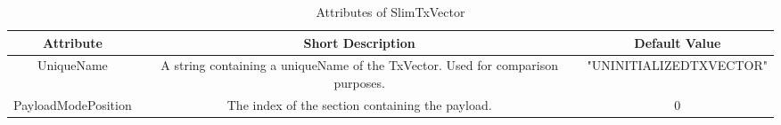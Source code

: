  \begin{longtable}{ | c | c | c |}

\caption{Attributes of SlimTxVector}\label{table:SlimTxVectorTable}	\\
 
     \hline
  \textbf{Attribute} & \textbf{Short Description} & \textbf{Default Value} \\ \hline
 
     
    
 UniqueName & \parbox[][][t]{5cm}{\vspace{6pt}\raggedright A string containing a uniqueName of the TxVector. Used for comparison purposes.\vspace{6pt}} & 
                   "UNINITIALIZEDTXVECTOR" \\ \hline 

 PayloadModePosition &  \parbox[][][t]{5cm}{\vspace{6pt}\raggedright The index of the section containing the payload. \vspace{6pt}} & 
                   0 \\ \hline 
                   




       							  		
	   
 \end{longtable}   

